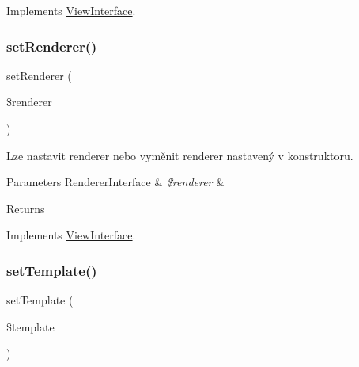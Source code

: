 Implements \mbox{\hyperlink{interface_pes_1_1_view_1_1_view_interface}{View\+Interface}}.

\mbox{\label{class_pes_1_1_view_1_1_view_a2858c054f485d8b15887f6cbbdc4087b}} 
\subsubsection{\texorpdfstring{set\+Renderer()}{setRenderer()}}
{\footnotesize\ttfamily set\+Renderer (\begin{DoxyParamCaption}\item[{\mbox{\hyperlink{interface_pes_1_1_view_1_1_renderer_1_1_renderer_interface}{Renderer\+Interface}}}]{\$renderer }\end{DoxyParamCaption})}

Lze nastavit renderer nebo vyměnit renderer nastavený v konstruktoru. 
\begin{DoxyParams}[1]{Parameters}
Renderer\+Interface & {\em \$renderer} & \\
\hline
\end{DoxyParams}
\begin{DoxyReturn}{Returns}

\end{DoxyReturn}


Implements \mbox{\hyperlink{interface_pes_1_1_view_1_1_view_interface}{View\+Interface}}.

\mbox{\label{class_pes_1_1_view_1_1_view_aa36ace36242d7477b0f7ad44a05bd292}} 
\subsubsection{\texorpdfstring{set\+Template()}{setTemplate()}}
{\footnotesize\ttfamily set\+Template (\begin{DoxyParamCaption}\item[{\mbox{\hyperlink{interface_pes_1_1_view_1_1_template_1_1_template_interface}{Template\+Interface}}}]{\$template }\end{DoxyParamCaption})}

